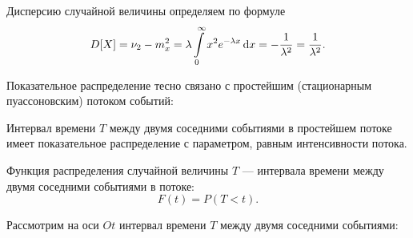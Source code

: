 \documentclass[a4paper]{article}
\begin{document}
                    Дисперсию случайной величины определяем по формуле
                    \begin{equation*}
                        D[X] = \nu_2 - m_x^2 =
                            \lambda \int\limits_{0}^{\infty} x^2 e^{-\lambda x} \dif x =
                            - \frac{1}{\lambda^2} = \frac{1}{\lambda^2} . 
                    \end{equation*}

                    Показательное распределение тесно связано с простейшим (стационарным пуассоновским) потоком событий:
                    
                    Интервал времени $T$ между двумя соседними событиями в простейшем потоке
                    имеет показательное распределение с параметром, равным интенсивности потока.

                    Функция распределения случайной величины $T$ --- интервала времени между двумя соседними событиями в потоке:
                    \begin{equation*}
                        F(t) = P(T < t) .
                    \end{equation*}

                    Рассмотрим на оси $Ot$ интервал времени $T$ между двумя соседними событиями:

\end{document}
